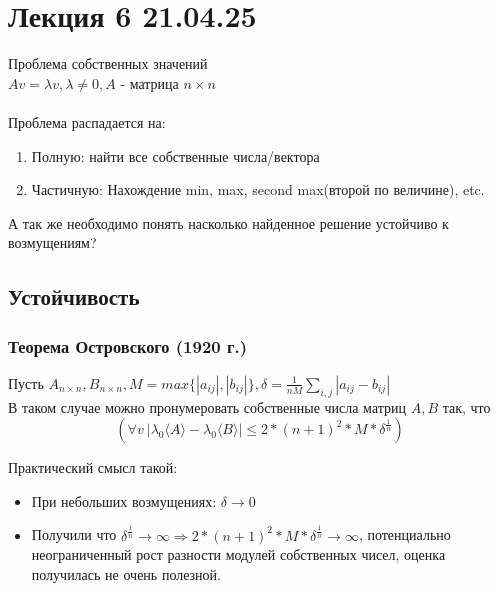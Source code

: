 \section{Лекция 6 21.04.25}
Проблема собственных значений
\\
\(Av = \lambda v, \lambda \ne 0, A\) - матрица \({n \times n}\)
\\
\\
Проблема распадается на:
\begin{enumerate}
    \item Полную: найти все собственные числа/вектора 
    \item Частичную: Нахождение min, max, second max(второй по величине), etc.
\end{enumerate}
А так же необходимо понять насколько найденное решение устойчиво к возмущениям?
\newline

\subsection{Устойчивость}
\subsubsection{Теорема Островского (1920 г.)}  
Пусть \(A_{n \times n}, B_{n \times n}, M = max\{ |a_{ij}|, |b_{ij}|\}, \delta = \frac{1}{nM}\sum_{i,j}|a_{ij} - b_{ij}|\) \\
В таком случае можно пронумеровать собственные числа матриц \(A, B\) так, что \[ (\forall v\ |\lambda_0\langle A \rangle - \lambda_0\langle B \rangle| \leq 2 * (n+1)^2 *M * \delta^{\frac{1}{n}} ) \]

Практический смысл такой: 
\begin{itemize}
    \item При небольших возмущениях: \(\delta \rightarrow 0\)  
    \item Получили что $\delta^{\frac{1}{n}} \rightarrow \infty \Rightarrow 2 * (n+1)^2 *M * \delta^{\frac{1}{n}} \rightarrow \infty $, потенциально неограниченный рост разности модулей собственных чисел, оценка получилась не очень полезной.

\end{itemize}

